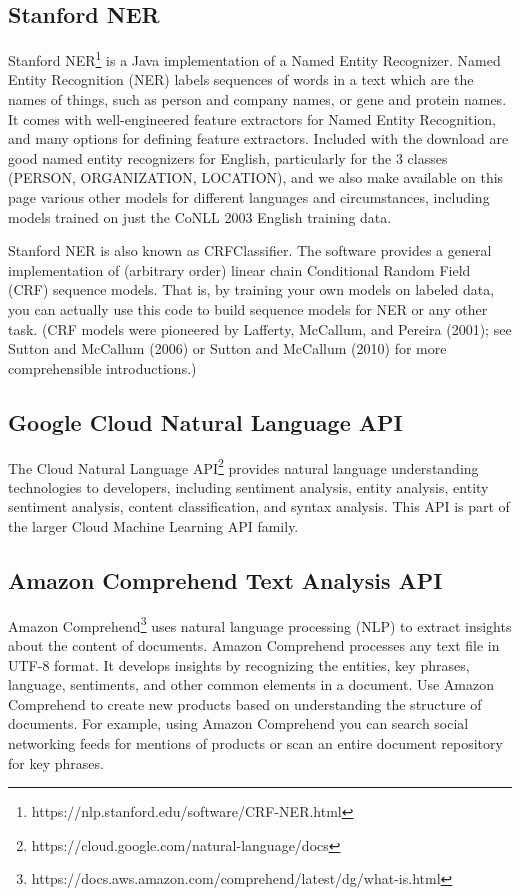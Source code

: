 \documentclass[conference]{IEEEtran}
\begin{document}
\subsection{Stanford NER}

Stanford NER\footnote{https://nlp.stanford.edu/software/CRF-NER.html}  is a Java implementation of a Named Entity Recognizer. Named Entity Recognition (NER) labels sequences of words in a text which are the names of things, such as person and company names, or gene and protein names. It comes with well-engineered feature extractors for Named Entity Recognition, and many options for defining feature extractors. Included with the download are good named entity recognizers for English, particularly for the 3 classes (PERSON, ORGANIZATION, LOCATION), and we also make available on this page various other models for different languages and circumstances, including models trained on just the CoNLL 2003 English training data.

Stanford NER is also known as CRFClassifier. The software provides a general implementation of (arbitrary order) linear chain Conditional Random Field (CRF) sequence models. That is, by training your own models on labeled data, you can actually use this code to build sequence models for NER or any other task. (CRF models were pioneered by Lafferty, McCallum, and Pereira (2001); see Sutton and McCallum (2006) or Sutton and McCallum (2010) for more comprehensible introductions.)

\subsection{Google Cloud Natural Language API}

The Cloud Natural Language API\footnote{https://cloud.google.com/natural-language/docs}  provides natural language understanding technologies to developers, including sentiment analysis, entity analysis, entity sentiment analysis, content classification, and syntax analysis. This API is part of the larger Cloud Machine Learning API family.

\subsection{Amazon Comprehend Text Analysis API}

Amazon Comprehend\footnote{https://docs.aws.amazon.com/comprehend/latest/dg/what-is.html} uses natural language processing (NLP) to extract insights about the content of documents. Amazon Comprehend processes any text file in UTF-8 format. It develops insights by recognizing the entities, key phrases, language, sentiments, and other common elements in a document. Use Amazon Comprehend to create new products based on understanding the structure of documents. For example, using Amazon Comprehend you can search social networking feeds for mentions of products or scan an entire document repository for key phrases.
\end{document}
